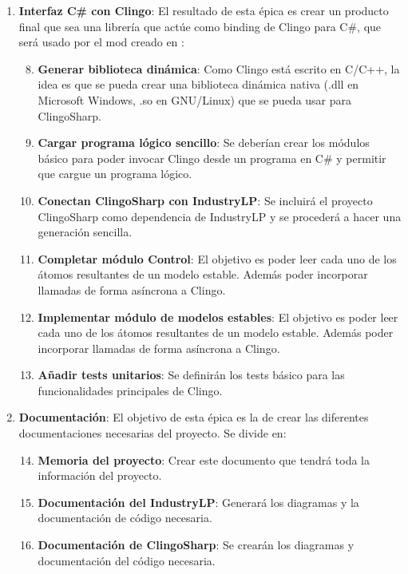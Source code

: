 \begin{enumerate}
	\item \textbf{Interfaz C\# con Clingo}: El resultado de esta épica es crear un producto final que sea una librería que actúe como binding de Clingo para C\#, que será usado por el mod creado en \cities:
	\begin{enumerate}[label={\arabic*.}]
		\setcounter{enumii}{7}
		\item \textbf{Generar biblioteca dinámica}: Como Clingo está escrito en C/C++, la idea es que se pueda crear una biblioteca dinámica nativa (.dll en Microsoft Windows, .so en GNU/Linux) que se pueda usar para ClingoSharp.
		\item \textbf{Cargar programa lógico sencillo}: Se deberían crear los módulos básico para poder invocar Clingo desde un programa en C\# y permitir que cargue un programa lógico.
		\item \textbf{Conectan ClingoSharp con IndustryLP}: Se incluirá el proyecto ClingoSharp como dependencia de IndustryLP y se procederá a hacer una generación sencilla.
		\item \textbf{Completar módulo Control}: El objetivo es poder leer cada uno de los átomos resultantes de un modelo estable. Además poder incorporar llamadas de forma asíncrona a Clingo.
		\item \textbf{Implementar módulo de modelos estables}: El objetivo es poder leer cada uno de los átomos resultantes de un modelo estable. Además poder incorporar llamadas de forma asíncrona a Clingo.
		\item \textbf{Añadir tests unitarios}: Se definirán los tests básico para las funcionalidades principales de Clingo.
	\end{enumerate}

	\item \textbf{Documentación}: El objetivo de esta épica es la de crear las diferentes documentaciones necesarias del proyecto. Se divide en:
	\begin{enumerate}[label={\arabic*.}]
		\setcounter{enumii}{13}
		\item \textbf{Memoria del proyecto}: Crear este documento que tendrá toda la información del proyecto.
		\item \textbf{Documentación del IndustryLP}: Generará los diagramas y la documentación de código necesaria.
		\item \textbf{Documentación de ClingoSharp}: Se crearán los diagramas y documentación del código necesaria.
	\end{enumerate}
\end{enumerate}


